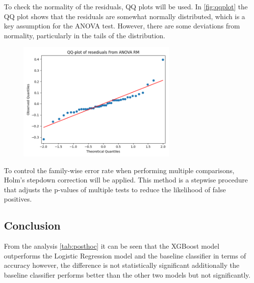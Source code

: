 	To check the normality of the residuals, QQ plots will be used. In \autoref{fig:qqplot} the QQ plot shows that
		the residuals are somewhat normally distributed, which is a key assumption for the ANOVA test.
		However, there are some deviations from normality, particularly in the tails of the distribution.

	\begin{figure}
		\centering
		\includegraphics[width=0.7\textwidth]{Part2/qqplot}
		\caption{}
	    \label{fig:qqplot}
	\end{figure}

	To control the family-wise error rate when performing multiple comparisons, Holm's stepdown correction will be
		applied.
		This method is a stepwise procedure that adjusts the p-values of multiple tests to reduce the likelihood of
	false positives.

		

		
\subsection{Conclusion}
From the analysis \autoref{tab:posthoc} it can be seen that the XGBoost model outperforms the Logistic Regression model
		and the baseline classifier in terms of accuracy however, the difference is not statistically significant
	additionally the baseline classifier performs better than the other two models but not significantly.

